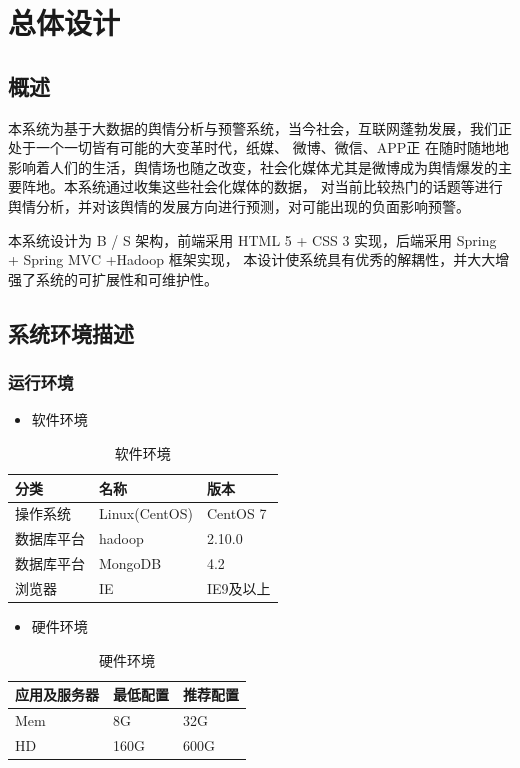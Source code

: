 \section{总体设计}
\subsection{概述}
本系统为基于大数据的舆情分析与预警系统，当今社会，互联网蓬勃发展，我们正处于一个一切皆有可能的大变革时代，纸媒、 微博、微信、APP正
在随时随地地影响着人们的生活，舆情场也随之改变，社会化媒体尤其是微博成为舆情爆发的主要阵地。本系统通过收集这些社会化媒体的数据，
对当前比较热门的话题等进行舆情分析，并对该舆情的发展方向进行预测，对可能出现的负面影响预警。

本系统设计为 B / S 架构，前端采用 HTML 5 + CSS 3 实现，后端采用 Spring + Spring MVC +Hadoop 框架实现，
本设计使系统具有优秀的解耦性，并大大增强了系统的可扩展性和可维护性。
\subsection{系统环境描述}
\subsubsection{运行环境}
\begin{itemize}
\item 软件环境
\end{itemize}

\begin{table}[!htbp]
	\centering
	\caption{软件环境}
	\label{tab:my-table}
	\begin{tabular}{|p{5cm}|p{4cm}|p{4cm}|}
		\hline
		分类 & 名称 & 版本 \\ \hline
		操作系统 & Linux(CentOS) & CentOS 7  \\ \hline
		数据库平台 & hadoop & 2.10.0  \\ \hline
		数据库平台 & MongoDB & 4.2  \\ \hline
		浏览器 & IE & IE9及以上  \\ \hline
	\end{tabular}
\end{table}
\newpage
\begin{itemize}
	\item 硬件环境
\end{itemize}	
\begin{table}[!htbp]
	\centering
	\caption{硬件环境}
	\label{tab:my-table1}
	\begin{tabular}{|p{5cm}|p{4cm}|p{4cm}|}
		\hline
		应用及服务器 & 最低配置 & 推荐配置 \\ \hline
		Mem & 8G & 32G \\ \hline
		HD & 160G & 600G \\ \hline
	\end{tabular}
\end{table}
